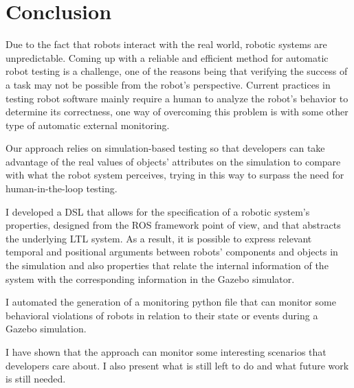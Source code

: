 \chapter{Conclusion}
\label{chap:conclusion}


Due to the fact that robots interact with the real world, robotic systems are unpredictable. Coming up with a reliable and efficient method for automatic robot testing is a challenge, one of the reasons being that verifying the success of a task may not be possible from the robot's perspective. Current practices in testing robot software mainly require a human to analyze the robot's behavior to determine its correctness, one way of overcoming this problem is with some other type of automatic external monitoring.

Our approach relies on simulation-based testing so that developers can take advantage of the real values of objects'
attributes on the simulation to compare with what the robot system perceives, trying in this way to surpass the need for human-in-the-loop testing.

I developed a DSL that allows for the specification of a robotic system's properties, designed from the ROS framework point of view, and that abstracts the underlying LTL system. As a result, it is possible to express relevant temporal and positional arguments between robots' components and objects in the simulation and also properties that relate the internal information of the system with the corresponding information in the Gazebo simulator.

I automated the generation of a monitoring python file that can monitor some behavioral violations of robots in relation to their state or events during a Gazebo simulation.

I have shown that the approach can monitor some interesting scenarios that developers care about. I also present what is still left to do and what future work is still needed.
